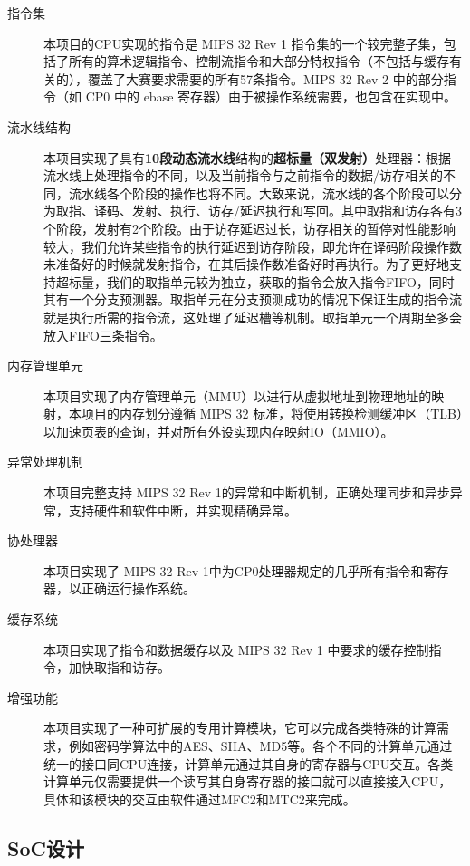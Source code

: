 \begin{description}

    \item[指令集] 本项目的CPU实现的指令是 MIPS 32 Rev 1 指令集的一个较完整子集，包括了所有的算术逻辑指令、控制流指令和大部分特权指令（不包括与缓存有关的），覆盖了大赛要求需要的所有57条指令。MIPS 32 Rev 2 中的部分指令（如 CP0 中的 ebase 寄存器）由于被操作系统需要，也包含在实现中。
    \item[流水线结构] 本项目实现了具有\textbf{10段动态流水线}结构的\textbf{超标量（双发射）}处理器：根据流水线上处理指令的不同，以及当前指令与之前指令的数据/访存相关的不同，流水线各个阶段的操作也将不同。大致来说，流水线的各个阶段可以分为取指、译码、发射、执行、访存/延迟执行和写回。其中取指和访存各有3个阶段，发射有2个阶段。由于访存延迟过长，访存相关的暂停对性能影响较大，我们允许某些指令的执行延迟到访存阶段，即允许在译码阶段操作数未准备好的时候就发射指令，在其后操作数准备好时再执行。为了更好地支持超标量，我们的取指单元较为独立，获取的指令会放入指令FIFO，同时其有一个分支预测器。取指单元在分支预测成功的情况下保证生成的指令流就是执行所需的指令流，这处理了延迟槽等机制。取指单元一个周期至多会放入FIFO三条指令。
    \item[内存管理单元] 本项目实现了内存管理单元（MMU）以进行从虚拟地址到物理地址的映射，本项目的内存划分遵循 MIPS 32 标准，将使用转换检测缓冲区（TLB）以加速页表的查询，并对所有外设实现内存映射IO（MMIO）。
    \item[异常处理机制] 本项目完整支持 MIPS 32 Rev 1的异常和中断机制，正确处理同步和异步异常，支持硬件和软件中断，并实现精确异常。
    \item[协处理器] 本项目实现了 MIPS 32 Rev 1中为CP0处理器规定的几乎所有指令和寄存器，以正确运行操作系统。
    \item[缓存系统] 本项目实现了指令和数据缓存以及 MIPS 32 Rev 1 中要求的缓存控制指令，加快取指和访存。
    \item[增强功能] 本项目实现了一种可扩展的专用计算模块，它可以完成各类特殊的计算需求，例如密码学算法中的AES、SHA、MD5等。各个不同的计算单元通过统一的接口同CPU连接，计算单元通过其自身的寄存器与CPU交互。各类计算单元仅需要提供一个读写其自身寄存器的接口就可以直接接入CPU，具体和该模块的交互由软件通过MFC2和MTC2来完成。

\end{description}

\subsection{SoC设计}


